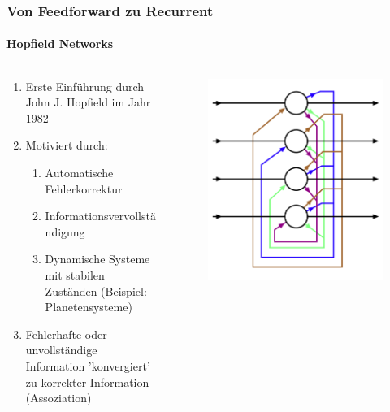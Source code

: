 \documentclass[german,aspectratio=169]{beamer}
\begin{document}
\begin{frame}
	\frametitle{Von Feedforward zu Recurrent}
	\framesubtitle{Hopfield Networks}
	\begin{columns}
		\begin{column}{0.6\textwidth}
			\begin{enumerate}[label=$\bullet$]
				\item Erste Einführung durch John J. Hopfield \cite{Hopfield1982} im Jahr 1982
				\item Motiviert durch:
					\begin{enumerate}[label=$\circ$]
						\item Automatische Fehlerkorrektur
						\item Informationsvervollständigung
						\item Dynamische Systeme mit stabilen Zuständen (Beispiel: Planetensysteme)
					\end{enumerate}
				\item Fehlerhafte oder unvollständige Information 'konvergiert' zu korrekter Information (Assoziation)
			\end{enumerate}
		\end{column}
		\begin{column}{0.3\textwidth}
			\begin{figure}
				\includegraphics[width=\textwidth]{hopfield-net.png}
			\end{figure}
		\end{column}
	\end{columns}
\end{frame}
\end{document}
